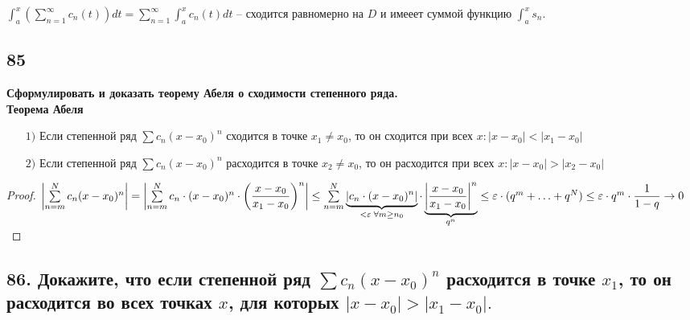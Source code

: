 \documentclass[a4paper, fleqn]{article}
\begin{document}
        $\int_{a}^{x}\left(\sum_{n=1}^{\infty} c_n(t)\right) dt = \sum_{n=1}^{\infty} \int_{a}^{x} c_n(t) dt$ -- сходится равномерно на $D$ и имееет суммой функцию $\int_a^x s_n$.
    
        
        
    \subsection*{85}
	\textbf{ Сформулировать и доказать теорему Абеля о сходимости степенного ряда.} \\[5 pt]
	\textbf{ Теорема Абеля} \\[-15 pt] 
	\begin{enumerate}
	\item[$1)$] Если степенной ряд $\sum c_n (x - x_0)^n$ сходится в точке $x_1 \ne x_0$, 
	то он сходится при всех $x : |x - x_0| < |x_1 - x_0|$
	\item[$2)$] Если степенной ряд $\sum c_n (x - x_0)^n$ расходится в точке $x_2 \ne x_0$, 
	то он расходится при всех $x : |x - x_0| > |x_2 - x_0|$\\[-30 pt]
	\end{enumerate}
	\begin{proof}
	$\left| \sum\limits_{n = m}^N c_n (x - x_0)^n \right| = 
	\left| \sum\limits_{n = m}^N c_n \cdot (x - x_0)^n \cdot \left( \dfrac{x - x_0}{x_1 - x_0} \right)^n \right| \le  \\[3 pt]
	\sum\limits_{n = m}^N \underbrace{\left| c_n \cdot (x - x_0)^n \right|}_{< \varepsilon \; \forall m \ge n_0} \cdot 
	\underbrace{\left| \dfrac{x - x_0}{x_1 - x_0} \right|^n}_{q^n}  \le
	\varepsilon \cdot (q^m + \ldots + q^N) \le \varepsilon \cdot q^m \cdot \dfrac1{1 - q} \to 0$
	\end{proof}    
    
    \subsection*{86. Докажите, что если степенной ряд $\displaystyle \sum c_n (x - x_0)^n$ расходится в точке $x_1$, то он расходится во всех точках $x$, для которых $|x - x_0| > |x_1 - x_0|.$}
        
\end{document}
